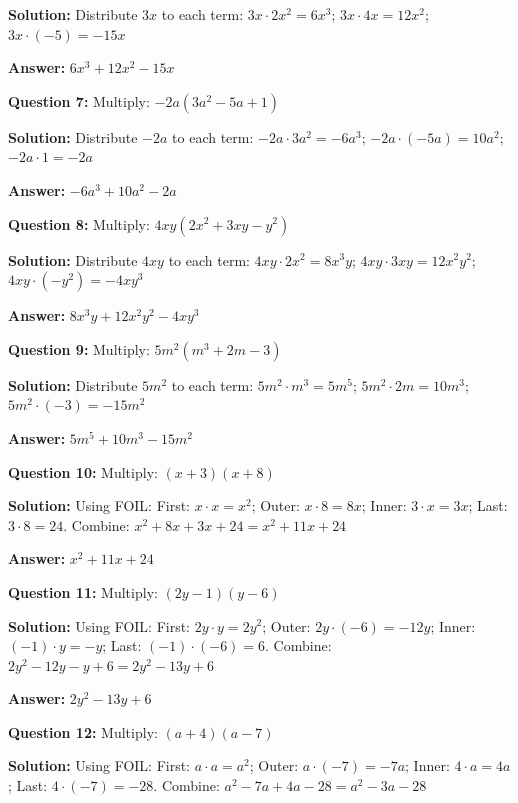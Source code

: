 \documentclass[12pt]{article}
\begin{document}
\textbf{Solution:} Distribute $3x$ to each term: $3x \cdot 2x^2 = 6x^3$; $3x \cdot 4x = 12x^2$; $3x \cdot (-5) = -15x$

\textbf{Answer:} $\boxed{6x^3 + 12x^2 - 15x}$

\vspace{0.3cm}
\noindent
\textbf{Question 7:} Multiply: $-2a(3a^2 - 5a + 1)$

\textbf{Solution:} Distribute $-2a$ to each term: $-2a \cdot 3a^2 = -6a^3$; $-2a \cdot (-5a) = 10a^2$; $-2a \cdot 1 = -2a$

\textbf{Answer:} $\boxed{-6a^3 + 10a^2 - 2a}$

\vspace{0.3cm}
\noindent
\textbf{Question 8:} Multiply: $4xy(2x^2 + 3xy - y^2)$

\textbf{Solution:} Distribute $4xy$ to each term: $4xy \cdot 2x^2 = 8x^3y$; $4xy \cdot 3xy = 12x^2y^2$; $4xy \cdot (-y^2) = -4xy^3$

\textbf{Answer:} $\boxed{8x^3y + 12x^2y^2 - 4xy^3}$

\vspace{0.3cm}
\noindent
\textbf{Question 9:} Multiply: $5m^2(m^3 + 2m - 3)$

\textbf{Solution:} Distribute $5m^2$ to each term: $5m^2 \cdot m^3 = 5m^5$; $5m^2 \cdot 2m = 10m^3$; $5m^2 \cdot (-3) = -15m^2$

\textbf{Answer:} $\boxed{5m^5 + 10m^3 - 15m^2}$

\vspace{0.3cm}
\noindent
\textbf{Question 10:} Multiply: $(x + 3)(x + 8)$

\textbf{Solution:} Using FOIL: First: $x \cdot x = x^2$; Outer: $x \cdot 8 = 8x$; Inner: $3 \cdot x = 3x$; Last: $3 \cdot 8 = 24$. Combine: $x^2 + 8x + 3x + 24 = x^2 + 11x + 24$

\textbf{Answer:} $\boxed{x^2 + 11x + 24}$

\vspace{0.3cm}
\noindent
\textbf{Question 11:} Multiply: $(2y - 1)(y - 6)$

\textbf{Solution:} Using FOIL: First: $2y \cdot y = 2y^2$; Outer: $2y \cdot (-6) = -12y$; Inner: $(-1) \cdot y = -y$; Last: $(-1) \cdot (-6) = 6$. Combine: $2y^2 - 12y - y + 6 = 2y^2 - 13y + 6$

\textbf{Answer:} $\boxed{2y^2 - 13y + 6}$

\vspace{0.3cm}
\noindent
\textbf{Question 12:} Multiply: $(a + 4)(a - 7)$

\textbf{Solution:} Using FOIL: First: $a \cdot a = a^2$; Outer: $a \cdot (-7) = -7a$; Inner: $4 \cdot a = 4a$; Last: $4 \cdot (-7) = -28$. Combine: $a^2 - 7a + 4a - 28 = a^2 - 3a - 28$
\end{document}
